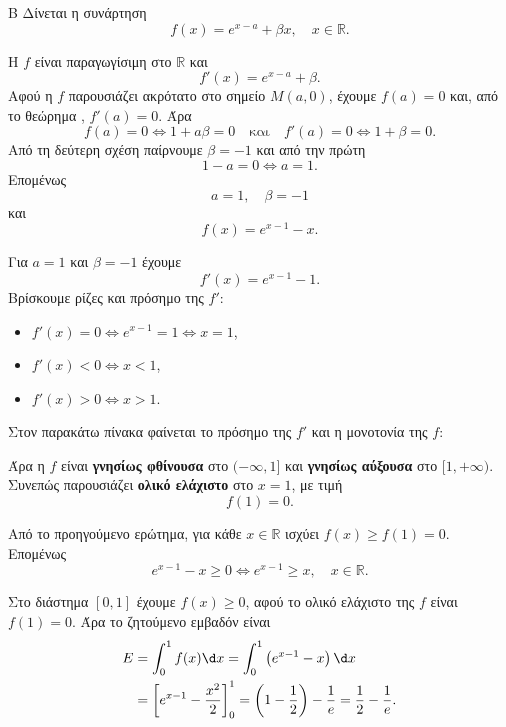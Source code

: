 
\begin{thema}{Β}
Δίνεται η συνάρτηση
\[
f(x)=e^{x-a}+\beta x,\quad x\in\mathbb{R}.
\]

\begin{erwthma}
\item Η $f$ είναι παραγωγίσιμη στο $\mathbb{R}$ και
\[
f'(x)=e^{x-a}+\beta.
\]
Αφού η $f$ παρουσιάζει ακρότατο στο σημείο $M(a,0)$, έχουμε $f(a)=0$ και, από το θεώρημα , $f'(a)=0$. Άρα
\[
f(a)=0\Leftrightarrow 1+a\beta=0
\quad\text{και}\quad
f'(a)=0\Leftrightarrow 1+\beta=0.
\]
Από τη δεύτερη σχέση παίρνουμε $\beta=-1$ και από την πρώτη
\[
1-a=0\Leftrightarrow a=1.
\]
Επομένως
\[
a=1,\quad \beta=-1
\]
και
\[
f(x)=e^{x-1}-x.
\]

\item Για $a=1$ και $\beta=-1$ έχουμε
\[
f'(x)=e^{x-1}-1.
\]
Βρίσκουμε ρίζες και πρόσημο της $f'$:
\begin{itemize}
\item $f'(x)=0\Leftrightarrow e^{x-1}=1\Leftrightarrow x=1$,
\item $f'(x)<0\Leftrightarrow x<1$,
\item $f'(x)>0\Leftrightarrow x>1$.
\end{itemize}
Στον παρακάτω πίνακα φαίνεται το πρόσημο της $f'$ και η μονοτονία της $f$:
\begin{center}
\end{center}
Άρα η $f$ είναι \textbf{γνησίως φθίνουσα} στο $(-\infty,1]$ και \textbf{γνησίως αύξουσα} στο $[1,+\infty)$. Συνεπώς παρουσιάζει \textbf{ολικό ελάχιστο} στο $x=1$, με τιμή
\[
f(1)=0.
\]

\item Από το προηγούμενο ερώτημα, για κάθε $x\in\mathbb{R}$ ισχύει $f(x)\geq f(1)=0$. Επομένως
\[
e^{x-1}-x\geq0\Leftrightarrow e^{x-1}\geq x,\quad x\in\mathbb{R}.
\]

\item Στο διάστημα $[0,1]$ έχουμε $f(x)\geq0$, αφού το ολικό ελάχιστο της $f$ είναι $f(1)=0$. Άρα το ζητούμενο εμβαδόν είναι
\begin{align*}
E&=\int_0^1 f(x)\d x
=\int_0^1\left(e^{x-1}-x\right)\d x\\
&=\left[e^{x-1}-\frac{x^2}{2}\right]_0^1
=\left(1-\frac{1}{2}\right)-\frac{1}{e}
=\frac{1}{2}-\frac{1}{e}.
\end{align*}
\end{erwthma}
\end{thema}

